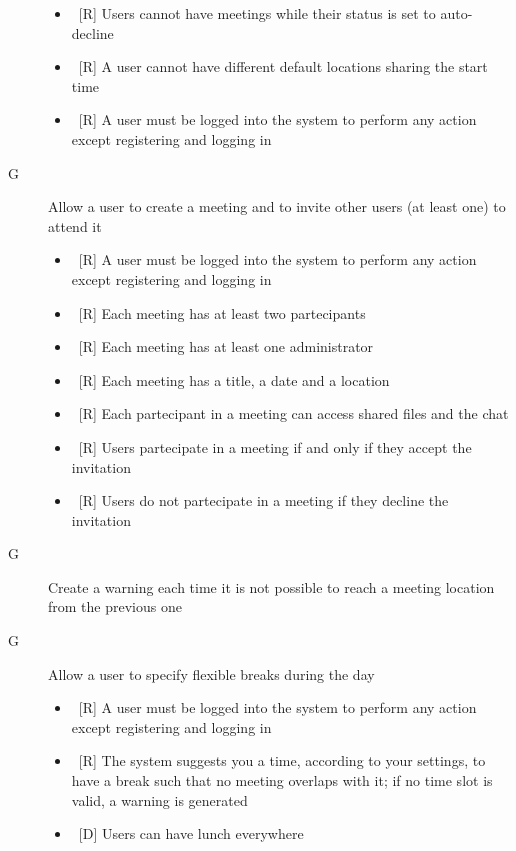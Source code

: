 \begin{description}
\begin{itemize}
\item~[R] Users cannot have meetings while their status is set to auto-decline
\item~[R] A user cannot have different default locations sharing the start time
\item~[R] A user must be logged into the system to perform any action except registering and logging in
\end{itemize}

\item[G\thecount] Allow a user to create a meeting and to invite other users (at least one) to attend it

\begin{itemize}
\item~[R] A user must be logged into the system to perform any action except registering and logging in
\item~[R] Each meeting has at least two partecipants
\item~[R] Each meeting has at least one administrator
\item~[R] Each meeting has a title, a date and a location
\item~[R] Each partecipant in a meeting can access shared files and the chat
\item~[R] Users partecipate in a meeting if and only if they accept the invitation
\item~[R] Users do not partecipate in a meeting if they decline the invitation
\end{itemize}

\item[G\thecount] Create a warning each time it is not possible to reach a meeting location from the previous one

\item[G\thecount] Allow a user to specify flexible breaks during the day

\begin{itemize}
\item~[R] A user must be logged into the system to perform any action except registering and logging in
\item~[R] The system suggests you a time, according to your settings, to have a break such that no meeting overlaps with it; if no time slot is valid, a warning is generated
\end{itemize}

\begin{itemize}
\item~[D] Users can have lunch everywhere
\end{itemize}


\end{description}
